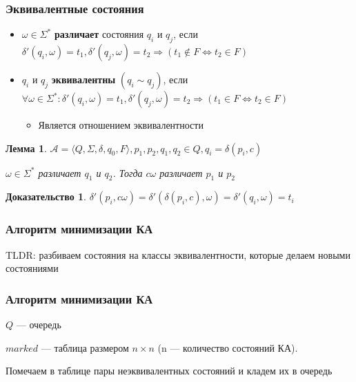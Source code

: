 \documentclass{beamer}
\newtheorem{ruproof}{Доказательство}
\newtheorem{rulemma}{Лемма}
\def\iff{\Leftrightarrow}
\begin{document}
\begin{frame}[fragile]
  \transwipe[direction=90]
  \frametitle{Эквивалентные состояния}
  \begin{itemize}
    \item $\omega \in \Sigma^*$ \textbf{различает} состояния $q_i$ и $q_j$, если $\delta' (q_i, \omega) = t_1, \delta' (q_j, \omega) = t_2 \Rightarrow (t_1 \notin F \iff t_2 \in F)$
    \item $q_i$ и $q_j$ \textbf{эквивалентны} $(q_i \sim q_j)$, если $\forall \omega \in \Sigma^*: \delta' (q_i, \omega) = t_1, \delta' (q_j, \omega) = t_2 \Rightarrow (t_1 \in F \iff t_2 \in F)$
    \begin{itemize}
      \item Является отношением эквивалентности
    \end{itemize}
  \end{itemize}
   \begin{rulemma}
      $\mathcal{A} = \langle Q, \Sigma, \delta, q_0, F \rangle, p_1, p_2, q_1, q_2 \in Q, q_i = \delta(p_i, c)$
      
      $\omega \in \Sigma^*$ различает $q_1$ и $q_2$. Тогда $c \omega$ различает $p_1$ и $p_2$
   \end{rulemma}
   
   \begin{ruproof}
     $\delta' (p_i, c \omega) = \delta' (\delta (p_i, c), \omega) = \delta' (q_i, \omega) = t_i$
   \end{ruproof}
\end{frame}

\begin{frame}[fragile]
  \transwipe[direction=90]
  \frametitle{Алгоритм минимизации КА}
    TLDR: разбиваем состояния на классы эквивалентности, которые делаем новыми состояниями

\end{frame}

\begin{frame}[fragile]
  \transwipe[direction=90]
  \frametitle{Алгоритм минимизации КА}

     $Q$ --- очередь
     
     \vspace{10pt}   
     
     $marked$ --- таблица размером $n \times n$ (n --- количество состояний КА).
     
     \vspace{10pt}
  
      Помечаем в таблице пары неэквивалентных состояний и кладем их в очередь

\end{frame}
      
\end{document}

